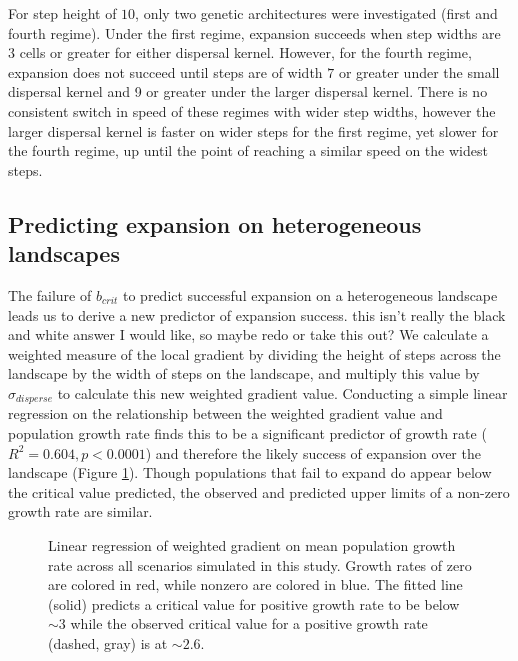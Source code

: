 For step height of $10$, only two genetic architectures were investigated (first and fourth regime). %
Under the first regime, expansion succeeds when step widths are $3$ cells or greater for either dispersal kernel. However, for the fourth regime, expansion does not succeed until steps are of width $7$ or greater under the small dispersal kernel and 9 or greater under the larger dispersal kernel. There is no consistent switch in speed of these regimes with wider step widths, however the larger dispersal kernel is faster on wider steps for the first regime, yet slower for the fourth regime, up until the point of reaching a similar speed on the widest steps.

\subsection{Predicting expansion on heterogeneous landscapes}
The failure of $b_{crit}$ to predict successful expansion on a heterogeneous landscape leads us to derive a new predictor of expansion success. \color{red}this isn't really the black and white answer I would like, so maybe redo or take this out? \color{black} We calculate a weighted measure of the local gradient by dividing the height of steps across the landscape by the width of steps on the landscape, and multiply this value by $\sigma_{disperse}$ to calculate this new weighted gradient value. Conducting a simple linear regression on the relationship between the weighted gradient value and population growth rate finds this to be a significant predictor of growth rate ($R^2 = 0.604, p < 0.0001$) and therefore the likely success of expansion over the landscape (Figure \ref{fig:linearmodel}). Though populations that fail to expand do appear below the critical value predicted, the observed and predicted upper limits of a non-zero growth rate are similar.

\begin{figure}[h]
\centering
{}
\caption[Linear regression of weighted gradient on population growth rate.]{Linear regression of weighted gradient on mean population growth rate across all scenarios simulated in this study. Growth rates of zero are colored in red, while nonzero are colored in blue. The fitted line (solid) predicts a critical value for positive growth rate to be below $\sim3$ while the observed critical value for a positive growth rate (dashed, gray) is at $\sim2.6$.}
\label{fig:linearmodel}
\end{figure}

